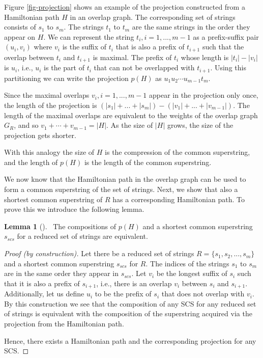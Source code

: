 \documentclass[english,twoside,censored,csm,algorithms-track-2020]{HYthesisML}
\theoremstyle{plain}
\theoremstyle{definition}
\newtheorem{lemma}[theorem]{Lemma}
\numberwithin{testexample}{chapter}
\begin{document}

Figure \ref{fig-projection} shows an example of the projection constructed from a
Hamiltonian path $H$ in an overlap graph. The corresponding set of
strings consists of $s_1$ to $s_m$.
The strings $t_1$ to $t_m$ are the same strings in the order they appear on $H$.
We can represent the string $t_i, i=1,...,m-1$ as a prefix-suffix pair
$(u_i,v_i)$ where $v_i$ is the suffix of $t_i$ that is also a prefix of $t_{i+1}$ such that the
overlap between $t_i$ and $t_{i+1}$ is maximal. The prefix of $t_i$ whose length is $|t_i|-|v_i|$ is
$u_i$, i.e., $u_i$ is the part of $t_i$ that can not be overlapped with $t_{i+1}$. Using this
partitioning we can write the projection $p(H)$ as $u_1u_2\cdots u_{m-1}t_m$.

Since the maximal overlaps $v_i,i=1,...,m-1$ appear in the projection only once, the length of the
projection is $(|s_1|+...+|s_m|) - (|v_1|+...+|v_{m-1}|)$. The length of the maximal overlaps
are equivalent to the weights of the overlap graph $G_R$, and so $v_1+\cdots +v_{m-1} = |H|$. As the size
of $|H|$ grows, the size of the projection gets shorter.


With this analogy the size of $H$ is the compression of the common superstring,
and the length of $p(H)$ is the length of the common superstring.

We now know that the Hamiltonian path in the overlap graph can be used to form a common superstring
of the set of strings. Next, we show that also a shortest common superstring of $R$ has a
corresponding Hamiltonian path. To prove this we introduce the following lemma.


\begin{lemma}[]~\label{lem-composition}
The compositions of $p(H)$ and a shortest common superstring $s_{scs}$ for a reduced set of strings are equivalent.
\end{lemma}
\begin{proof}[Proof (by construction)]
  Let there be a reduced set of strings $R=\{s_1,s_2,...,s_m\}$ and
  a shortest common superstring $s_{scs}$ for $R$. The indices of the strings $s_1$ to $s_m$ are in the same
  order they appear in $s_{scs}$. Let $v_i$ be the longest suffix of $s_i$ such that it is also a prefix
  of $s_{i+1}$, i.e., there is an overlap $v_i$ between $s_i$ and $s_{i+1}$. Additionally, let us
  define $u_i$ to be the prefix of $s_i$ that does not overlap with $v_i$. By this construction we
  see that the composition of any SCS for any reduced set of strings is equivalent with the composition
  of the superstring acquired via the projection from the Hamiltonian path.

  Hence, there exists a Hamiltonian path and the corresponding projection for any SCS.
\end{proof}
\end{document}
